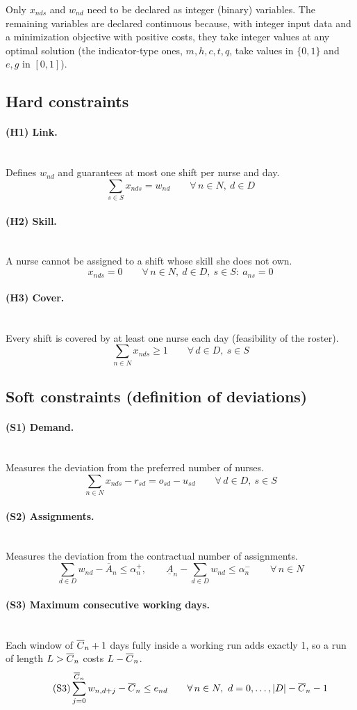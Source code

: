 \documentclass[11pt,a4paper]{article}
\newcommand{\Amin}{\underline{A}}   \newcommand{\Amax}{\overline{A}}
\newcommand{\forallidx}[1]{\qquad \forall\, #1}
\newcommand{\constraint}[2]{\paragraph{#1}\mbox{}\\[-0.4em] #2}
\begin{document}
Only $x_{nds}$ and $w_{nd}$ need to be declared as integer (binary) variables. The remaining variables are declared continuous because, with integer input data and a minimization objective with positive costs, they take integer values at any optimal solution (the indicator-type ones, $m,h,c,t,q$, take values in $\{0,1\}$ and $e,g$ in $[0,1]$).

\subsection{Hard constraints}

\constraint{(H1) Link.}{Defines $w_{nd}$ and guarantees at most one shift per nurse and day.}
\begin{equation}\tag{H1}\label{c:link}
\sum_{s\in S} x_{nds}=w_{nd}\forallidx{n\in N,\ d\in D}
\end{equation}

\constraint{(H2) Skill.}{A nurse cannot be assigned to a shift whose skill she does not own.}
\begin{equation}\tag{H2}\label{c:skill}
x_{nds}=0\forallidx{n\in N,\ d\in D,\ s\in S:\ a_{ns}=0}
\end{equation}

\constraint{(H3) Cover.}{Every shift is covered by at least one nurse each day (feasibility of the roster).}
\begin{equation}\tag{H3}\label{c:cover}
\sum_{n\in N} x_{nds}\ge 1\forallidx{d\in D,\ s\in S}
\end{equation}

\subsection{Soft constraints (definition of deviations)}

\constraint{(S1) Demand.}{Measures the deviation from the preferred number of nurses.}
\begin{equation}\tag{S1}\label{c:dem}
\sum_{n\in N} x_{nds}-r_{sd}=o_{sd}-u_{sd}\forallidx{d\in D,\ s\in S}
\end{equation}

\constraint{(S2) Assignments.}{Measures the deviation from the contractual number of assignments.}
\begin{equation}\tag{S2}\label{c:asg}
\sum_{d\in D} w_{nd}-\Amax_n\le \alpha^+_n,\qquad
\Amin_n-\sum_{d\in D} w_{nd}\le \alpha^-_n
\forallidx{n\in N}
\end{equation}

\constraint{(S3) Maximum consecutive working days.}{Each window of $\overline{C}_n+1$ days fully inside a working run adds exactly 1, so a run of length $L>\overline{C}_n$ costs $L-\overline{C}_n$.}
\begin{equation}\tag{S3}\label{c:maxw}
\sum_{j=0}^{\Cmax_n} w_{n,d+j}-\Cmax_n\le e_{nd}
\forallidx{n\in N,\ d=0,\dots,|D|-\Cmax_n-1}
\end{equation}
\end{document}
